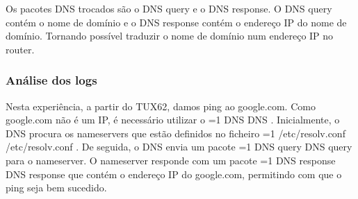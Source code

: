 \documentclass[11pt,a4paper,twocolumn]{article}
\newcommand{\hl}[2][1]{%
  \ifnum#1=1\relax
    \textcolor{text-hl1}{#2}%
  \else
    \textcolor{text-hl2}{#2}%
  \fi
}
\begin{document}
Os pacotes DNS  trocados são o DNS query e o DNS response. O DNS query contém o nome de domínio e o DNS response contém o endereço IP do nome de domínio. Tornando possível traduzir o nome de domínio num endereço IP no router.

\subsubsection{Análise dos logs}

Nesta experiência, a partir do TUX62, damos ping ao google.com. Como google.com não é um IP, é necessário utilizar o \hl{DNS}. 
Inicialmente, o DNS procura os nameservers que estão definidos no ficheiro \hl{/etc/resolv.conf}. De seguida, o DNS envia um pacote \hl{DNS query} para o nameserver. O nameserver responde com um pacote \hl{DNS response} que contém o endereço IP do google.com, permitindo com que o ping seja bem sucedido.
\end{document}
